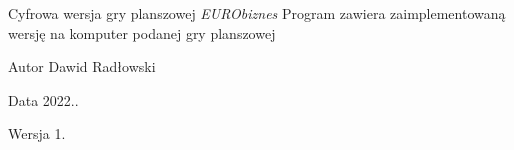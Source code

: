 \begin{DoxyParagraph}{Cyfrowa wersja gry planszowej {\itshape EURObiznes} }
Program zawiera zaimplementowaną wersję na komputer podanej gry planszowej 
\end{DoxyParagraph}
\begin{DoxyAuthor}{Autor}
Dawid Radłowski 
\end{DoxyAuthor}
\begin{DoxyDate}{Data}
2022.. 
\end{DoxyDate}
\begin{DoxyVersion}{Wersja}
1. 
\end{DoxyVersion}
